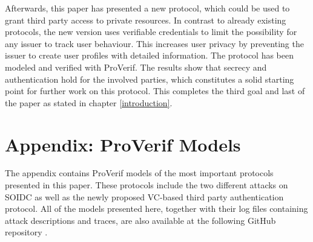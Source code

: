 \documentclass[11pt,twoside,a4paper,openright]{book}
\begin{document}
Afterwards, this paper has presented a new protocol, which could be used to grant third party access to private resources. In contrast to already existing protocols, the new version uses verifiable credentials to limit the possibility for any issuer to track user behaviour. This increases user privacy by preventing the issuer to create user profiles with detailed information. The protocol has been modeled and verified with ProVerif. The results show that secrecy and authentication hold for the involved parties, which constitutes a solid starting point for further work on this protocol. This completes the third goal and last of the paper as stated in chapter \ref{introduction}.


\backmatter


\newpage




\appendix
\label{appendix}

\chapter{Appendix: ProVerif Models}

The appendix contains ProVerif models of the most important protocols presented in this paper. These protocols include the two different attacks on SOIDC as well as the newly proposed VC-based third party authentication protocol. All of the models presented here, together with their log files containing attack descriptions and traces, are also available at the following GitHub repository \cite{githubGilles}.

\end{document}

